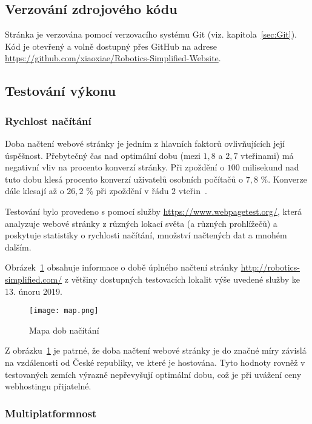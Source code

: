 \documentclass[a4paper, 12pt]{article}
\newcommand*{\fullref}[1]{\hyperref[{#1}]{\ref*{#1}}}
\begin{document}
  \subsection{Verzování zdrojového kódu}
  Stránka je verzována pomocí verzovacího systému Git (viz. kapitola~\fullref{sec:Git}). Kód je otevřený a volně dostupný přes GitHub na adrese \url{https://github.com/xiaoxiae/Robotics-Simplified-Website}.


  \subsection{Testování výkonu}

  \subsubsection{Rychlost načítání}
  Doba načtení webové stránky je jedním z hlavních faktorů ovlivňujících její úspěšnost. Přebytečný čas nad optimální dobu (mezi $1,8$ a $2,7$ vteřinami) má negativní vliv na procento konverzí stránky. Při zpoždění o $100$ milisekund nad tuto dobu klesá procento konverzí uživatelů osobních počítačů o $7,8$ \%. Konverze dále klesají až o $26,2$ \% při zpoždění v řádu $2$ vteřin~\cite{conversion-rate-statistics}.

  Testování bylo provedeno s pomocí služby \url{https://www.webpagetest.org/}, která analyzuje webové stránky z různých lokací světa (a různých prohlížečů) a poskytuje statistiky o rychlosti načítání, množství načtených dat a mnohém dalším.

  Obrázek~\ref{img:Mapa dob načítání} obsahuje informace o době úplného načtení stránky \url{http://robotics-simplified.com/} z většiny dostupných testovacích lokalit výše uvedené služby ke 13. únoru 2019.

  \begin{figure}[H]
    \texttt{[image: map.png]}
    \caption{Mapa dob načítání} \label{img:Mapa dob načítání}
  \end{figure}

  Z obrázku~\ref{img:Mapa dob načítání} je patrné, že doba načtení webové stránky je do značné míry závislá na vzdálenosti od České republiky, ve které je hostována. Tyto hodnoty rovněž v testovaných zemích výrazně nepřevyšují optimální dobu, což je při uvážení ceny webhostingu přijatelné.


  \subsubsection{Multiplatformnost}
\end{document}
